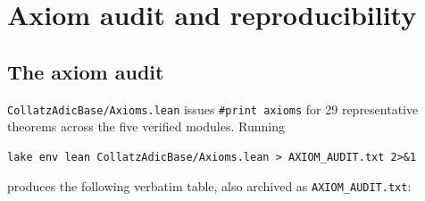 \documentclass[11pt,a4paper]{article}
\begin{document}
\section{Axiom audit and reproducibility}
\label{sec:audit}

\subsection{The axiom audit}

\texttt{CollatzAdicBase/Axioms.lean} issues \texttt{\#print axioms} for 29
representative theorems across the five verified modules.  Running

\begin{lstlisting}
lake env lean CollatzAdicBase/Axioms.lean > AXIOM_AUDIT.txt 2>&1
\end{lstlisting}

\noindent produces the following verbatim table, also archived as
\texttt{AXIOM\_AUDIT.txt}:
\end{document}
